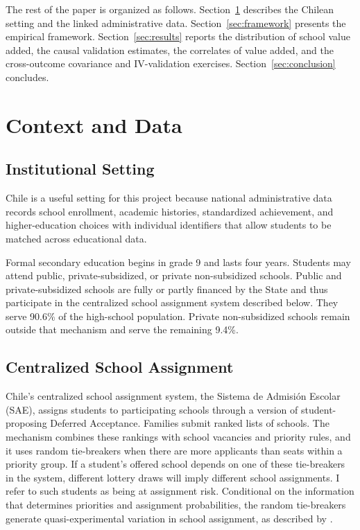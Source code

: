 \documentclass[a4paper, article, english, oneside, unknownkeysallowed, 12pt]{memoir}
\begin{document}
The rest of the paper is organized as follows.
Section~\ref{sec:context} describes the Chilean setting and the linked administrative data.
Section~\ref{sec:framework} presents the empirical framework.
Section~\ref{sec:results} reports the distribution of school value added, the causal validation estimates, the correlates of value added, and the cross-outcome covariance and IV-validation exercises.
Section~\ref{sec:conclusion} concludes.
 

\clearpage
\section{Context and Data}
\label{sec:context}

\subsection{Institutional Setting}

Chile is a useful setting for this project because national administrative data records school enrollment, academic histories, standardized achievement, and higher-education choices with individual identifiers that allow students to be matched across educational data.

Formal secondary education begins in grade 9 and lasts four years.
Students may attend public, private-subsidized, or private non-subsidized schools.
Public and private-subsidized schools are fully or partly financed by the State and thus participate in the centralized school assignment system described below.
They serve 90.6\% of the high-school population. Private non-subsidized schools remain outside that mechanism and serve the remaining 9.4\%.



\subsection{Centralized School Assignment}

Chile's centralized school assignment system, the Sistema de Admisi\'on Escolar (SAE), assigns students to participating schools through a version of student-proposing Deferred Acceptance.
Families submit ranked lists of schools.
The mechanism combines these rankings with school vacancies and priority rules, and it uses random tie-breakers when there are more applicants than seats within a priority group.
If a student's offered school depends on one of these tie-breakers in the system, different lottery draws will imply different school assignments.
I refer to such students as being at assignment risk. 
Conditional on the information that determines priorities and assignment probabilities, the random tie-breakers generate quasi-experimental variation in school assignment, as described by \textcite{abdulkadiroglu_research_2017}.
\end{document}
